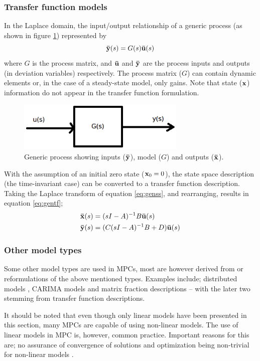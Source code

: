 \subsubsection{Transfer function models}
In the Laplace domain, the input/output relationship of a generic process (as shown in figure \ref{fig:genmodel}) represented by
\begin{equation*}
  {\bf {\bar y}}(s)=G(s){\bf {\bar u}}(s)
\end{equation*}
where $G$ is the process matrix, and ${\bf {\bar u}}$ and ${\bf {\bar y}}$ are the process inputs and outputs (in deviation variables) respectively.
The process matrix ($G$) can contain dynamic elements or, in the case of a steady-state model, only gains.
Note that state (${\bf {x}}$) information do not appear in the transfer function formulation.
\begin{figure}[htbp]
  \centering
  \includegraphics[width=8cm]{graph/model_genprocess}
  \caption[Generic input/output model]{Generic process showing inputs (${\bf {\bar y}}$), model ($G$) and outputs (${\bf {\bar x}}$).}
  \label{fig:genmodel}
\end{figure}
With the assumption of an initial zero state (${\bf {x}}_0=0$), the state space description (the time-invariant case) can be converted to a transfer function description.
Taking the Laplace transform of equation \ref{eq:genss}, and rearranging, results in equation \ref{eq:gentf};
\begin{align}
  \label{eq:gentf}
    {\bf {\bar x}}(s) &= (sI-A)^{-1}B{\bf {\bar u}}(s) \\
    {\bf {\bar y}}(s) &= (C(sI-A)^{-1}B+D){\bf {\bar u}}(s) \notag
\end{align} 
\subsubsection{Other model types}
Some other model types are used in MPCs, most are however derived from or reformulations of the above mentioned types.
Examples include; distributed models \citep[4]{rawlings}, CARIMA models and matrix fraction descriptions \citep[24,28]{rossiter} -- with the later two stemming from transfer function descriptions.

It should be noted that even though only linear models have been presented in this section, many MPCs are capable of using non-linear models.
The use of linear models in MPC is, however, common practice.
Important reasons for this are; no assurance of convergence of solutions and optimization being non-trivial for non-linear models \citep[17]{rossiter}.

